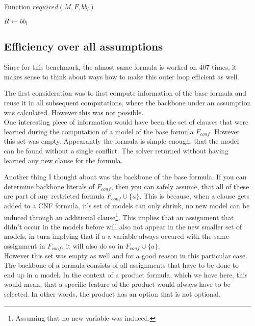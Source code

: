 \begin{algorithm}
\caption{{\sc Function $required(M,F,bb_l)$ }}
\label{alg:specReq}
\DontPrintSemicolon
{}
$R \gets bb_l$\;
\;

\end{algorithm}




\subsection{Efficiency over all assumptions}
Since for this benchmark, the almost same formula is worked on 407 times, it makes sense to think about ways how to make this outer loop efficient as well.

The first consideration was to first compute information of the base formula and reuse it in all subsequent computations, where the backbone under an assumption was calculated. However this was not possible.\\
One interesting piece of information would have been the set of clauses that were learned during the computation of a model of the base formula $F_{conf}$. However this set was empty. Appearantly the formula is simple enough, that the model can be found without a single conflict. The solver returned without having learned any new clause for the formula.

Another thing I thought about was the backbone of the base formula. If you can determine backbone literals of $F_{conf}$, then you can safely assume, that all of these are part of any restricted formula $F_{conf} \cup \{a\}$. This is because, when a clause gets added to a CNF formula, it's set of models can only shrink, no new model can be induced through an additional clause\footnote{Assuming that no new variable was induced.}. This implies that an assignment that didn't occur in the models before will also not appear in the new smaller set of models, in turn implying that if a a variable always occured with the same assignment in $F_{conf}$, it will also do so in $F_{conf} \cup \{a\}$. \\
However this set was empty as well and for a good reason in this particular case. The backbone of a formula consists of all assignments that have to be done to end up in a model. In the context of a product formula, which we have here, this would mean, that a specific feature of the product would always have to be selected. In other words, the product has an option that is not optional. 

